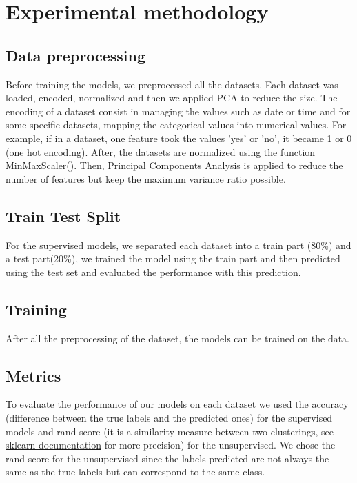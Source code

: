 \documentclass[10pt, a4paper]{article}
\begin{document}
\section{Experimental methodology}
\subsection{Data preprocessing}
Before training the models, we preprocessed all the datasets. Each dataset was loaded, encoded, normalized and then we applied PCA to reduce the size. The encoding of a dataset consist in managing the values such as date or time and for some specific datasets, mapping the categorical values into numerical values. For example, if in a dataset, one feature took the values 'yes' or 'no', it became 1 or 0 (one hot encoding).
After, the datasets are normalized using the function MinMaxScaler().
Then, Principal Components Analysis is applied to reduce the number of features but keep the maximum variance ratio possible.

\subsection{Train Test Split}
For the supervised models, we separated each dataset into a train part (80\%) and a test part(20\%), we trained the model using the train part and then predicted using the test set and evaluated the performance with this prediction.

\subsection{Training}
After all the preprocessing of the dataset, the models can be trained on the data.

\subsection{Metrics}
To evaluate the performance of our models on each dataset we used the accuracy (difference between the true labels and the predicted ones) for the supervised models and rand score (it is a similarity measure between two clusterings, see \href{https://scikit-learn.org/stable/modules/generated/sklearn.metrics.rand_score.html#sklearn.metrics.rand_score}{sklearn documentation} for more precision) for the unsupervised. We chose the rand score for the unsupervised since the labels predicted are not always the same as the true labels but can correspond to the same class.
\newpage
\end{document}
